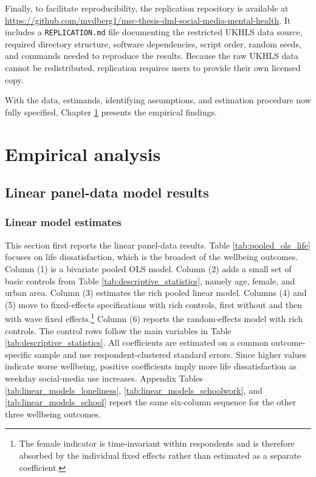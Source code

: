 \documentclass[11pt,oneside,a4paper]{book}
\newcommand{\tocchapter}[2]{%
  \chapter[#1]{#2}%
}
\newcommand{\tocsection}[2]{%
  \section[#1]{#2}%
}
\begin{document}
Finally, to facilitate reproducibility, the replication repository is available at \url{https://github.com/mvdberg1/msc-thesis-dml-social-media-mental-health}. It includes a \texttt{REPLICATION.md} file documenting the restricted UKHLS data source, required directory structure, software dependencies, script order, random seeds, and commands needed to reproduce the results. Because the raw UKHLS data cannot be redistributed, replication requires users to provide their own licensed copy.

With the data, estimands, identifying assumptions, and estimation procedure now fully specified, Chapter \ref{chap:res} presents the empirical findings.

\tocchapter{Empirical Analysis}{Empirical analysis}
\label{chap:res}

\tocsection{Linear Panel-Data Model Results}{Linear panel-data model results}

\subsection[Linear Model Estimates]{Linear model estimates}

This section first reports the linear panel-data results. Table \ref{tab:pooled_ols_life} focuses on life dissatisfaction, which is the broadest of the wellbeing outcomes. Column (1) is a bivariate pooled OLS model. Column (2) adds a small set of basic controls from Table \ref{tab:descriptive_statistics}, namely age, female, and urban area. Column (3) estimates the rich pooled linear model. Columns (4) and (5) move to fixed-effects specifications with rich controls, first without and then with wave fixed effects.\footnote{The female indicator is time-invariant within respondents and is therefore absorbed by the individual fixed effects rather than estimated as a separate coefficient.} Column (6) reports the random-effects model with rich controls. The control rows follow the main variables in Table \ref{tab:descriptive_statistics}. All coefficients are estimated on a common outcome-specific sample and use respondent-clustered standard errors. Since higher values indicate worse wellbeing, positive coefficients imply more life dissatisfaction as weekday social-media use increases. Appendix Tables \ref{tab:linear_models_loneliness}, \ref{tab:linear_models_schoolwork}, and \ref{tab:linear_models_school} report the same six-column sequence for the other three wellbeing outcomes.


\end{document}

